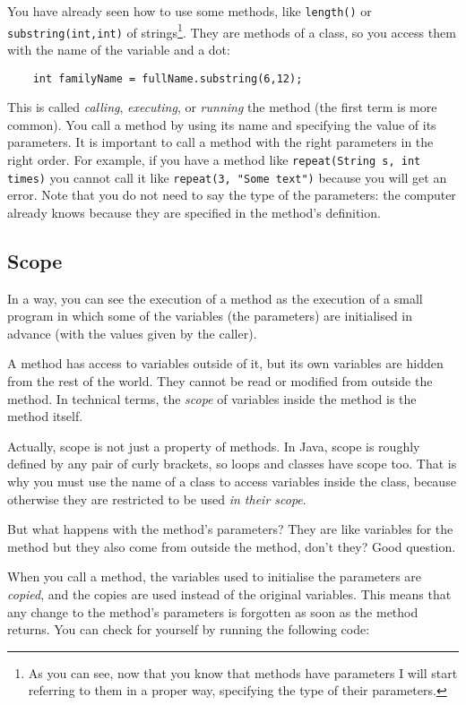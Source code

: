 You have already seen how to use some methods, like
\verb+length()+ or \verb+substring(int,int)+ of strings\footnote{As
  you can see, now that you know that methods have parameters I will
  start referring to them in a proper way, specifying the type of
  their parameters.}. They are methods of a
class, so you access them with the name of the variable and a dot: 

\begin{verbatim}
    int familyName = fullName.substring(6,12);
\end{verbatim}

This is called \emph{calling}, \emph{executing}, or \emph{running} the
method (the first term is more common). 
You call a method by using its name and specifying the value of its
parameters. 
It is important to call a
method with the right parameters in the right order. For example, if
you have a method like \verb+repeat(String s, int times)+ you 
cannot call it like \verb+repeat(3, "Some text")+ because you will get
an error. Note that you do not need to say the type of the
parameters: the computer already knows because they are specified in
the method's definition. 

\subsection{Scope}

In a way, you can see the execution of a method as the execution of a
small program in which some of the variables (the parameters) are
initialised in advance (with the values given by the caller). 

A method has access to variables outside of it, but its own variables
are hidden from the rest of the world. They cannot be read or modified
from outside the method. In technical terms, the \emph{scope} of
variables inside the method is the method itself. 

Actually, scope is not just a property of methods. In Java, scope is
roughly defined by any pair of curly brackets, so loops and classes
have scope too. That is why you must use the name of a class to access
variables inside the class, because otherwise they are restricted to
be used \emph{in their scope}. 

But what happens with the method's parameters? They are like variables
for the method but they also come from outside the method, don't they?
Good question. 

When you call a method, the variables used to initialise the
parameters are \emph{copied}, and the copies are used instead of the
original variables. This means that any change to the method's
parameters is forgotten as soon as the method returns. You can check
for yourself by running the following code: 

